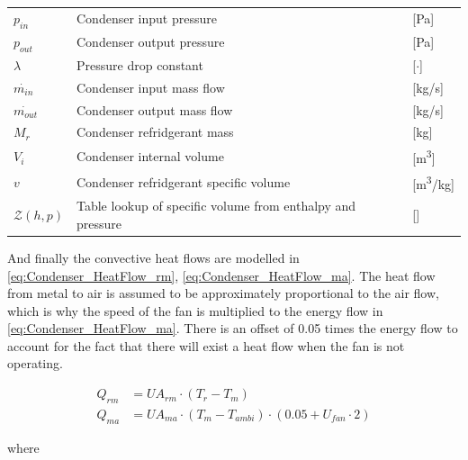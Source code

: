 \begin{center}
	\begin{tabular}{l p{8cm} l}
		$p_{in}$        & Condenser input pressure                                   & [\si{Pa}]          \\
		$p_{out}$       & Condenser output pressure                                  & [\si{Pa}]          \\
		$\lambda$       & Pressure drop constant                                     & [$\cdot$]          \\
		$\dot{m_{in}}$  & Condenser input mass flow                                  & [\si{kg}/\si{s}]   \\
		$\dot{m_{out}}$ & Condenser output mass flow                                 & [\si{kg}/\si{s}]   \\
		$M_{r}$         & Condenser refridgerant mass                                & [\si{kg}]          \\
		$V_{i}$         & Condenser internal volume                                  & [\si{m^3}]         \\
		$v$             & Condenser refridgerant specific volume                     & [\si{m^3}/\si{kg}] \\
		$\mathcal{Z}(h,p)$        & Table lookup of specific volume from enthalpy and pressure & []
	\end{tabular}
\end{center}


And finally the convective heat flows are modelled in \cref{eq:Condenser_HeatFlow_rm}, \cref{eq:Condenser_HeatFlow_ma}. The heat flow from metal to air is assumed to be approximately proportional to the air flow, which is why the speed of the fan is multiplied to the energy flow in \cref{eq:Condenser_HeatFlow_ma}. There is an offset of 0.05 times the energy flow to account for the fact that there will exist a heat flow when the fan is not operating.

\begin{align}
	Q_{rm}	 			& = U A_{rm} \cdot (T_r - T_m)							\label{eq:Condenser_HeatFlow_rm}\\
	Q_{ma}	 			& = U A_{ma} \cdot (T_m - T_{ambi})\cdot (0.05 + U_{fan} \cdot 2)				\label{eq:Condenser_HeatFlow_ma}
\end{align}

where

